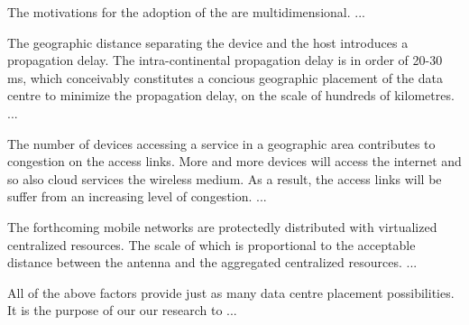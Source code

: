 The motivations for the adoption of the \xcloud are multidimensional. ...

The geographic distance separating the device and the host introduces a propagation delay. The intra-continental propagation delay is in order of 20-30 ms, which conceivably constitutes a concious geographic placement of the data centre to minimize the propagation delay, on the scale of hundreds of kilometres. ...

The number of devices accessing a service in a geographic area contributes to congestion on the access links. More and more devices will access the internet and so also cloud services the wireless medium. As a result, the access links will be suffer from an increasing level of congestion. ...

The forthcoming mobile networks are protectedly distributed with virtualized centralized resources. The scale of which is proportional to the acceptable distance between the antenna and the aggregated centralized resources. ...

All of the above factors provide just as many data centre placement possibilities. It is the purpose of our our research to ...